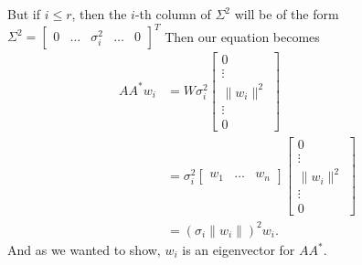 \documentclass{article}
\begin{document}
\begin{enumerate}
    But if $i\leq r$, then the $i$-th column of $\Sigma^2$ will be of the form $\Sigma^2=\begin{bmatrix} 0& \dots& \sigma_i^2& \dots & 0 \end{bmatrix}^{T}$ 
    Then our equation becomes
    \begin{align*}
        A A^* w_i&=  W\sigma_i^2\begin{bmatrix} 0\\ \vdots\\ \|w_i\|^2\\ \vdots \\ 0 \end{bmatrix}\\
        &=  \sigma_i^2\begin{bmatrix} w_1&\dots&w_n \end{bmatrix}\begin{bmatrix} 0\\ \vdots\\ \|w_i\|^2\\ \vdots \\ 0 \end{bmatrix}\\
        &= (\sigma_i\|w_i\|)^2w_i 
    .\end{align*}
    And as we wanted to show, $w_i$ is an eigenvector for $A A^* $.
\end{enumerate}
\end{document}
